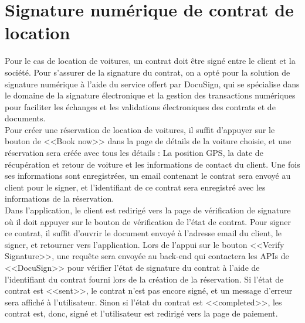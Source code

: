 \section{Signature numérique de contrat de location}
Pour le cas de location de voitures, un contrat doit être signé entre le client et la société. Pour s'assurer de la signature du contrat, on a opté pour la solution de signature numérique à l'aide du service offert par DocuSign, qui se spécialise dans le domaine de la signature électronique et la gestion des transactions numériques pour faciliter les échanges et les validations électroniques des contrats et de documents.\\
\noindent Pour créer une réservation de location de voitures, il suffit d'appuyer sur le bouton de <<Book now>> dans la page de détails de la voiture choisie, et une réservation sera créée avec tous les détails : La position GPS, la date de récupération et retour de voiture et les informations de contact du client. Une fois ses informations sont enregistrées, un email contenant le contrat sera envoyé au client pour le signer, et l'identifiant de ce contrat sera enregistré avec les informations de la réservation.\\
\noindent Dans l'application, le client est redirigé vers la page de vérification de signature où il doit appuyer sur le bouton de vérification de l'état de contrat. Pour signer ce contrat, il suffit d'ouvrir le document envoyé à l'adresse email du client, le signer, et retourner vers l'application. Lors de l'appui sur le bouton <<Verify Signature>>, une requête sera envoyée au back-end qui contactera les APIs de <<DocuSign>> pour vérifier l'état de signature du contrat à l'aide de l'identifiant du contrat fourni lors de la création de la réservation. Si l'état de contrat est <<sent>>, le contrat n'est pas encore signé, et un message d'erreur sera affiché à l'utilisateur. Sinon si l'état du contrat est <<completed>>, les contrat est, donc, signé et l'utilisateur est redirigé vers la page de paiement.
\vspace{1cm}

